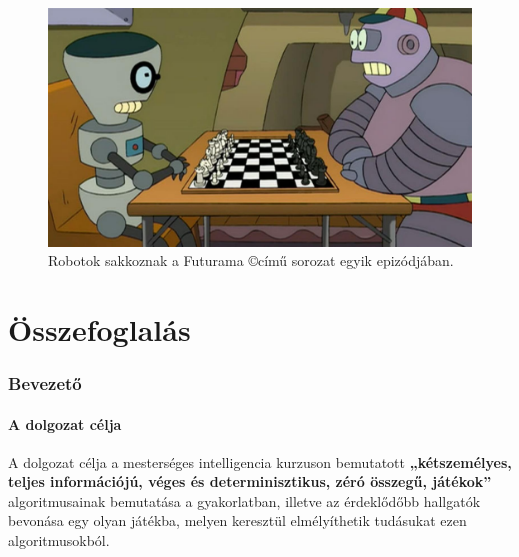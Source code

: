 \documentclass[twoside, a4paper, 12pt]{article}
\title{\THESISTITLE}
\author{\THESISAUTHOR}
\date{\THESISDEFENCEYEAR}
\begin{document}
\pagestyle{empty}


\cleardoublepage

\null
\vspace*{\fill}
\begin{figure}[htbp]
	\centering
	\includegraphics[width=1.0\textwidth]{img/bots_chess.png}
	\caption{Robotok sakkoznak a Futurama \copyright című sorozat egyik epizódjában.}
	\label{fig:bots_chess}
\end{figure}
\vspace*{\fill}
\null
\cleardoublepage

\tableofcontents
\cleardoublepage


\pagestyle{plain}
\setcounter{page}{1}

\newpage


\part{Összefoglalás}
\section{Bevezető}
\subsection{A dolgozat célja}
A dolgozat célja a mesterséges intelligencia kurzuson bemutatott \textbf{„kétszemélyes, teljes információjú, véges és determinisztikus, zéró összegű, játékok”} algoritmusainak bemutatása a gyakorlatban, illetve az érdeklődőbb hallgatók bevonása egy olyan játékba, melyen keresztül elmélyíthetik tudásukat ezen algoritmusokból.
\end{document}

